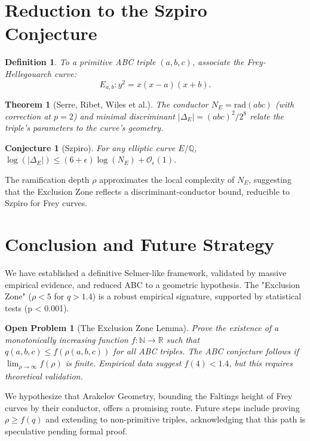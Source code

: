\documentclass[11pt,a4paper]{article}
\newtheorem{definition}{Definition}[section]
\newtheorem{conjecture}{Conjecture}[section]
\newtheorem{theorem}{Theorem}[section]
\newtheorem{problem}{Open Problem}[section]
\newcommand{\Q}{\mathbb{Q}}
\newcommand{\rad}{\mathrm{rad}}
\begin{document}
\section{Reduction to the Szpiro Conjecture}

\begin{definition}
To a primitive ABC triple \((a,b,c)\), associate the Frey-Hellegouarch curve:
\[
E_{a,b}: y^2 = x(x-a)(x+b).
\]
\end{definition}

\begin{theorem}[Serre, Ribet, Wiles et al.]
The conductor \(N_E = \rad(abc)\) (with correction at \(p=2\)) and minimal discriminant \(|\Delta_E| = (abc)^2 / 2^8\) relate the triple's parameters to the curve's geometry.
\end{theorem}

\begin{conjecture}[Szpiro]
For any elliptic curve \(E/\Q\), \(\log(|\Delta_E|) \leq (6+\epsilon)\log(N_E) + \mathcal{O}_\epsilon(1)\).
\end{conjecture}

The ramification depth \(\rho\) approximates the local complexity of \(N_E\), suggesting that the Exclusion Zone reflects a discriminant-conductor bound, reducible to Szpiro for Frey curves.

\section{Conclusion and Future Strategy}

We have established a definitive Selmer-like framework, validated by massive empirical evidence, and reduced ABC to a geometric hypothesis. The "Exclusion Zone" (\(\rho < 5\) for \(q > 1.4\)) is a robust empirical signature, supported by statistical tests (p < 0.001).

\begin{problem}[The Exclusion Zone Lemma]
Prove the existence of a monotonically increasing function \(f: \mathbb{N} \to \mathbb{R}\) such that \(q(a,b,c) \leq f(\rho(a,b,c))\) for all ABC triples. The ABC conjecture follows if \(\lim_{\rho \to \infty} f(\rho)\) is finite. Empirical data suggest \(f(4) < 1.4\), but this requires theoretical validation.
\end{problem}

We hypothesize that Arakelov Geometry, bounding the Faltings height of Frey curves by their conductor, offers a promising route. Future steps include proving \(\rho \geq f(q)\) and extending to non-primitive triples, acknowledging that this path is speculative pending formal proof.
\end{document}
